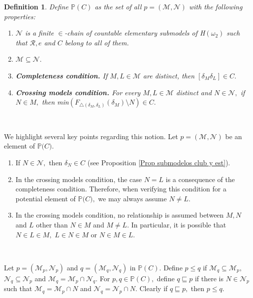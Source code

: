 \documentclass{article}
\newtheorem{definition}[theorem]{Definition}
\begin{document}
\begin{definition}
Define $\mathbb{P}\left(  C\right)  $ as the set of all $p=(\mathcal{M}%
,\mathcal{N})$ with the following properties:

\begin{enumerate}
\item $\mathcal{N}$ is a finite $\in$-chain of countable elementary submodels
of \textsf{H}$\left(  \omega_{2}\right)  $ such that $\mathcal{R},e$ and $C$
belong to all of them.

\item $\mathcal{M\subseteq N}.$

\item \textbf{Completeness condition. }If $M,L\in\mathcal{M}$ are distinct,
then $\left[  \delta_{M}\delta_{L}\right]  \in C.$

\item \textbf{Crossing models condition. }For every $M,L\in\mathcal{M}$
distinct and $N\in\mathcal{N},$ if $N\in M,$ then \textsf{min}$(F_{\triangle
\left(  \delta_{M},\delta_{L}\right)  }\left(  \delta_{M}\right)  \setminus
N)\in C.$
\end{enumerate}
\end{definition}

\qquad\ \qquad\ \qquad\ \ 

We highlight several key points regarding this notion. Let $p=(\mathcal{M}%
,\mathcal{N})$ be an element of $\mathbb{P(}C\mathbb{)}.$

\begin{enumerate}
\item If $N\in\mathcal{N},$ then $\delta_{N}\in C$ (see Proposition
\ref{Prop submodelos club y est}).

\item In the crossing models condition, the case $N=L$ is a consequence of the
completeness condition. Therefore, when verifying this condition for a
potential element of $\mathbb{P(}C\mathbb{)},$ we may always assume $N\neq L.$

\item In the crossing models condition, no relationship is assumed between
$M,N$ and $L$ other than $N\in M$ and $M\neq L.$ In particular, it is possible
that $N\in L\in M,$ $L\in N\in M$ or $N\in M\in L.$
\end{enumerate}

\qquad\ \qquad\ \ \ \qquad\ \ \ \ \ 

Let $p=(\mathcal{M}_{p},\mathcal{N}_{p})$ and $q=(\mathcal{M}_{q}%
,\mathcal{N}_{q})$ in $\mathbb{P}\left(  C\right)  .$ Define $p\leq q$ if
$\mathcal{M}_{q}\subseteq\mathcal{M}_{p},$ $\mathcal{N}_{q}\subseteq
\mathcal{N}_{p}$ and $\mathcal{M}_{q}=\mathcal{M}_{p}\cap\mathcal{N}_{q}.$ For
$p,q\in\mathbb{P}\left(  C\right)  ,$ define $q\sqsubseteq p$ if there is
$N\in\mathcal{N}_{p}$ such that $\mathcal{M}_{q}=\mathcal{M}_{p}\cap N$ and
$\mathcal{N}_{q}=\mathcal{N}_{p}\cap N.$ Clearly if $q\sqsubseteq p,$ then
$p\leq q.$
\end{document}
